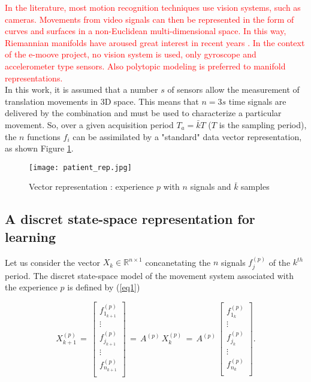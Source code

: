 \documentclass[letterpaper, 10 pt, conference]{ieeeconf}  %
\newcommand{\mR}{{\mathbb R}}
\begin{document}
\textcolor{red}{In the literature, most motion recognition techniques use vision systems, such as cameras. Movements from video signals can then be represented in the form of curves and surfaces in a non-Euclidean multi-dimensional space. In this way, Riemannian manifolds have aroused great interest in recent years \cite{bia12,liu13}. In the context of the e-moove project, no vision system is used, only gyroscope and accelerometer type sensors. Also polytopic modeling is preferred to manifold representations.}\\
In this work, it is assumed that a number $s$ of sensors allow the measurement of translation movements in 3D space. This means that $n=3s$ time signals are delivered by the combination and must be used to characterize a particular movement. So, over a given acquisition period $T_a=\bar{k}T$ ($T$ is the sampling period), the $n$ functions $f_i$ can be assimilated  by a "standard" data vector representation, as shown Figure \ref{fig:datare}.

\begin{figure}
	\begin{center}
		\texttt{[image: patient\_rep.jpg]}
		\caption{Vector representation : experience $p$ with $n$ signals and $\bar{k}$ samples} 
		\label{fig:datare}
	\end{center}
\end{figure}

\subsection{A discret state-space representation for learning}

Let us consider the vector $ X_k \in \mR^{n \times 1} $ concanetating the $n$ signals $f_j^{(p)}$ of the $k^{th}$ period. The discret state-space model of the movement system associated with the experience $p$ is defined by (\ref{eq1})

\begin{equation}
\label{eq1}
X_{k+1}^{(p)}\,=\,
\left[ \begin{array}{l}
f_{1_{k+1}}^{(p)}\\
\vdots\\
f_{j_{k+1}}^{(p)}\\
\vdots\\
f_{n_{k+1}}^{(p)}\\
\end{array} \right]\,=\,
A^{(p)} \, X_k^{(p)}\,=\,
A^{(p)} \,
\left[ \begin{array}{l}
f_{1_{k}}^{(p)}\\
\vdots\\
f_{j_{k}}^{(p)}\\
\vdots\\
f_{n_{k}}^{(p)}\\
\end{array} \right].
\end{equation}
\end{document}
